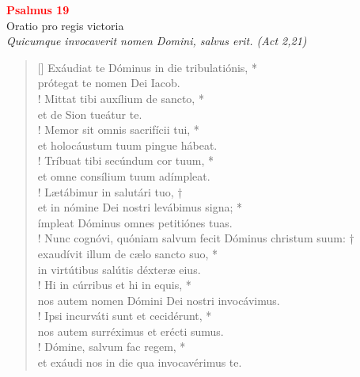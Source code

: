


\def\greinitialformat#1{%
{\fontsize{39}{39}\selectfont #1}%
}




\vspace{0.3cm}
\begin{center}
 \textcolor{red}{\large \bf Psalmus 19}\\
Oratio pro regis victoria\\
\textit{\small Quicumque invocaverit nomen Domini, salvus erit. (Act 2,21)}
\end{center}
\begin{verse}[\versewidth]
Exáudiat te Dóminus in die tribulatiónis, *\\
prótegat te nomen Dei Iacob.\\!
\vin Mittat tibi auxílium de sancto, *\\
\vin et de Sion tueátur te.\\!
Memor sit omnis sacrifícii tui, *\\
et holocáustum tuum pingue hábeat.\\!
\vin Tríbuat tibi secúndum cor tuum, *\\
\vin et omne consílium tuum adímpleat.\\!
Lætábimur in salutári tuo, †\\
et in nómine Dei nostri levábimus signa; *\\
ímpleat Dóminus omnes petitiónes tuas.\\!
\vin Nunc cognóvi, \verselinebreak quóniam salvum fecit Dóminus christum suum: †\\
\vin exaudívit illum de cælo sancto suo, *\\
\vin in virtútibus salútis déxteræ eius.\\!
Hi in cúrribus et hi in equis, *\\
nos autem nomen Dómini Dei nostri invocávimus.\\!
\vin Ipsi incurváti sunt et cecidérunt, *\\
\vin nos autem surréximus et erécti sumus.\\!
Dómine, salvum fac regem, *\\
et exáudi nos in die qua invocavérimus te.\\
\end{verse}
\vspace{1cm}


